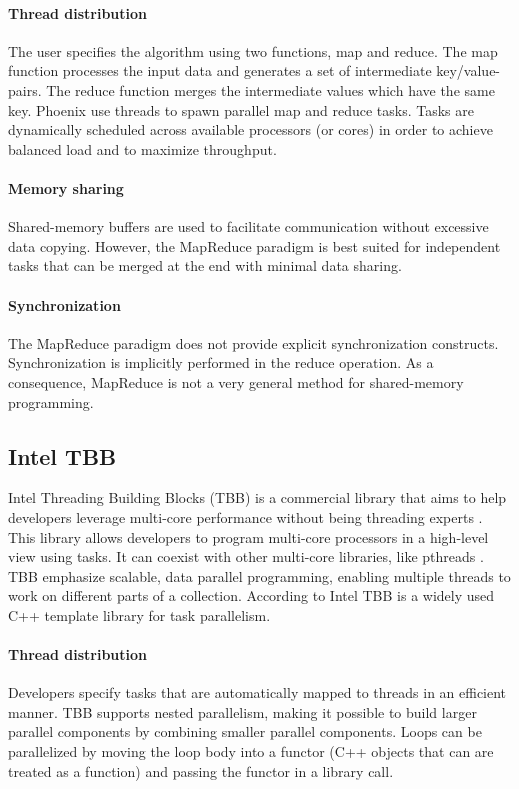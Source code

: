 \paragraph{Thread distribution} The user specifies the algorithm using
two functions, map and reduce. The map function processes the input
data and generates a set of intermediate key/value-pairs. The reduce
function merges the intermediate values which have the same key.
Phoenix use threads to spawn parallel map and reduce tasks. Tasks are
dynamically scheduled across available processors (or cores) in order
to achieve balanced load and to maximize throughput.

\paragraph{Memory sharing} Shared-memory buffers are used to
facilitate communication without excessive data copying. However, the
MapReduce paradigm is best suited for independent tasks that can be
merged at the end with minimal data sharing.

\paragraph{Synchronization} The MapReduce paradigm does not provide
explicit synchronization constructs. Synchronization is implicitly
performed in the reduce operation. As a consequence, MapReduce is not
a very general method for shared-memory programming.

\subsection{Intel TBB}

Intel Threading Building Blocks (TBB) is a commercial library that
aims to help developers leverage multi-core performance without being
threading experts \cite{tbbarticle}.  This library allows developers
to program multi-core processors in a high-level view using tasks. It
can coexist with other multi-core libraries, like pthreads \cite{tbb}.
TBB emphasize scalable, data parallel programming, enabling multiple
threads to work on different parts of a collection. According to Intel
TBB is a widely used C++ template library for task parallelism.

\paragraph{Thread distribution} Developers specify tasks that are
automatically mapped to threads in an efficient manner. TBB supports
nested parallelism, making it possible to build larger parallel
components by combining smaller parallel components. Loops can be
parallelized by moving the loop body into a functor (C++ objects that
can are treated as a function) and passing the functor in a library
call.

